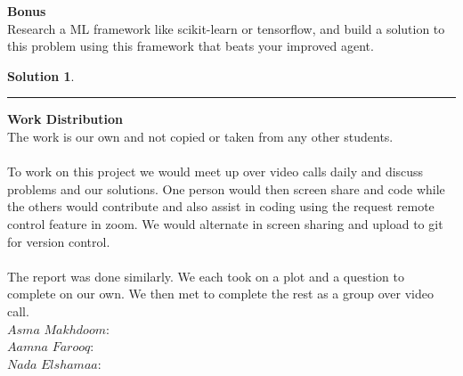 \documentclass{article}
\theoremstyle{definition}
\def\fline{\rule{0.75\linewidth}{0.5pt}}
\newcommand{\finishline}{\vspace{-15pt}\begin{center}\fline\end{center}}
\newtheorem*{solution*}{Solution}
\newenvironment{solution}{\begin{solution*}}{{\finishline} \end{solution*}}
\begin{document}
\textbf{\Large Bonus} \\
    Research a ML framework like scikit-learn or tensorflow, and build a solution to this problem using this framework that beats your improved agent.
\begin{solution} \hfill \\
    
\end{solution}
\smallskip   

\textbf{Work Distribution}
\\
The work is our own and not copied or taken from any other students. 
\\\\
To work on this project we would meet up over video calls daily and discuss problems and our solutions. One person would then screen share and code while the others would contribute and also assist in coding using the request remote control feature in zoom. We would alternate in screen sharing and upload to git for version control. 
\\\\
The report was done similarly. We each took on a plot and a question to complete on our own. We then met to complete the rest as a group over video call. 
\\
$Asma$ $Makhdoom:$ 
\\
$Aamna$ $Farooq:$ 
\\
$Nada$ $Elshamaa:$ 
\\
\smallskip
\end{document}
